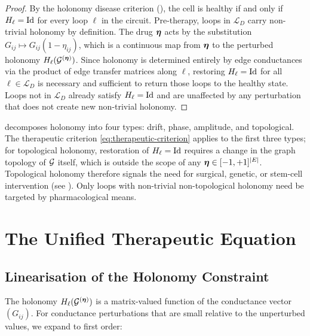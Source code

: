 \begin{proof}
By the holonomy disease criterion (), the cell is
healthy if and only if $H_\ell = \mathrm{Id}$ for every loop $\ell$ in the
circuit.  Pre-therapy, loops in $\mathcal{L}_D$ carry non-trivial holonomy by
definition.  The drug $\boldsymbol{\eta}$ acts by the substitution
$G_{ij} \mapsto G_{ij}(1-\eta_{ij})$, which is a continuous map from
$\boldsymbol{\eta}$ to the perturbed holonomy $H_\ell(\mathcal{G}^{(\boldsymbol{\eta})})$.  Since
holonomy is determined entirely by edge conductances via the product of edge
transfer matrices along $\ell$, restoring $H_\ell = \mathrm{Id}$ for all
$\ell \in \mathcal{L}_D$ is necessary and sufficient to return those loops
to the healthy state.  Loops not in $\mathcal{L}_D$ already satisfy
$H_\ell = \mathrm{Id}$ and are unaffected by any perturbation that does not
create new non-trivial holonomy.
\end{proof}

\begin{remark}
 decomposes holonomy into four types:
drift, phase, amplitude, and topological.  The therapeutic criterion
\eqref{eq:therapeutic-criterion} applies to the first three types; for
topological holonomy, restoration of $H_\ell = \mathrm{Id}$ requires a change
in the graph topology of $\mathcal{G}$ itself, which is outside the scope of any
$\boldsymbol{\eta} \in [-1,+1]^{|E|}$.  Topological holonomy therefore signals the
need for surgical, genetic, or stem-cell intervention (see
).  Only loops with non-trivial non-topological holonomy
need be targeted by pharmacological means.
\end{remark}

\section{The Unified Therapeutic Equation}
\label{sec:therapeutic-equation}

\subsection{Linearisation of the Holonomy Constraint}

The holonomy $H_\ell(\mathcal{G}^{(\boldsymbol{\eta})})$ is a matrix-valued function of the
conductance vector $(G_{ij})$.  For conductance perturbations that are small
relative to the unperturbed values, we expand to first order:


